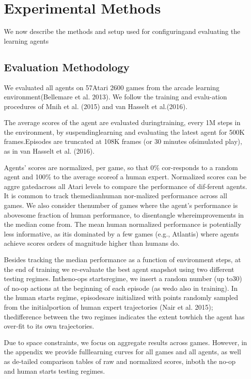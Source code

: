 \documentclass{article}
\begin{document}
\section{Experimental Methods}
\quad We now describe the methods and setup used for configuringand evaluating the learning agents

\subsection{Evaluation Methodology}
\quad We evaluated all agents on 57Atari  2600  games  from  the  arcade  learning  environment(Bellemare et al. 2013). We follow the training and evalu-ation procedures of Mnih et al. (2015) and van Hasselt et al.(2016). 

The average scores of the agent are evaluated duringtraining, every 1M steps in the environment, by suspendinglearning  and  evaluating  the  latest  agent  for  500K  frames.Episodes  are  truncated  at  108K  frames  (or  30  minutes  ofsimulated play), as in van Hasselt et al. (2016).

Agents’ scores are normalized, per game, so that 0\% cor-responds to a random agent and 100\% to the average scoreof  a  human  expert.  Normalized  scores  can  be  aggre gatedacross all Atari levels to compare the performance of dif-ferent agents. It is common to track themedianhuman nor-malized performance across all games. We also consider thenumber of games where the agent’s performance is abovesome fraction of human performance, to disentangle whereimprovements in the median come from. The mean human normalized performance is potentially less informative, as itis dominated by a few games (e.g., Atlantis) where agents achieve scores orders of magnitude higher than humans do.

Besides tracking the median performance as a function of environment steps, at the end of training we re-evaluate the best agent snapshot using two different testing regimes. Intheno-ops startsregime, we insert a random number (up to30) of no-op actions at the beginning of each episode (as wedo  also  in  training).  In  the human starts regime,  episodesare initialized with points randomly sampled from the initialportion of human expert trajectories (Nair et al. 2015); thedifference between the two regimes indicates the extent towhich the agent has over-fit to its own trajectories.

Due to space constraints, we focus on aggregate results across  games.  However,  in  the  appendix  we  provide  fulllearning curves for all games and all agents, as well as de-tailed comparison tables of raw and normalized scores, inboth the no-op and human starts testing regimes.
\end{document}
